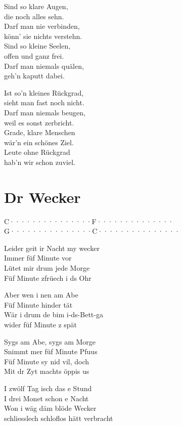 \documentclass[
  letterpaper,
  twoside=false]{scrbook}
\begin{document}
Sind so klare Augen,\\
die noch alles sehn.\\
Darf man nie verbinden,\\
könn' sie nichts verstehn.\\
Sind so kleine Seelen,\\
offen und ganz frei.\\
Darf man niemals quälen,\\
geh'n kaputt dabei.

Ist so'n kleines Rückgrad,\\
sieht man fast noch nicht.\\
Darf man niemals beugen,\\
weil es sonst zerbricht.\\
Grade, klare Menschen\\
wär'n ein schönes Ziel.\\
Leute ohne Rückgrad\\
hab'n wir schon zuviel.

\hypertarget{dr-wecker}{%
\chapter{Dr Wecker}\label{dr-wecker}}

\textbar C·······\textbar········\textbar F······\textbar········\textbar{}\\
\textbar G·······\textbar········\textbar C·······\textbar········\textbar{}

Leider geit ir Nacht my wecker\\
Immer füf Minute vor\\
Lütet mir drum jede Morge\\
Füf Minute z\textquotesingle früech i ds Ohr

Aber wen i nen am Abe\\
Füf Minute hinder tät\\
Wär i drum de bim i-ds-Bett-ga\\
wider füf Minute z spät

Syg\textquotesingle s am Abe, syg\textquotesingle s am Morge\\
S\textquotesingle nimmt mer füf Minute Pfuus\\
Füf Minute sy nid vil, doch\\
Mit dr Zyt macht\textquotesingle s öppis us

I zwölf Tag isch das e Stund\\
I drei Monet schon e Nacht\\
Won i wäg däm blöde Wecker\\
schliesslech schloflos hätt verbracht
\end{document}
